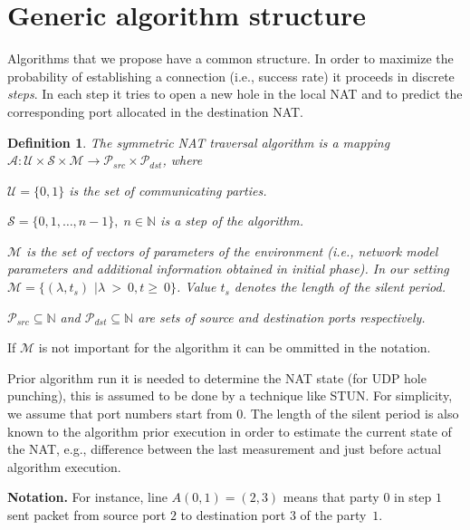 \documentclass{acm_proc_article-sp}
\newtheorem{mydef}{Definition}
\begin{document}
\section{Generic algorithm structure}
Algorithms that we propose have a common structure. In order to maximize the probability of establishing
a connection (i.e., success rate) it proceeds in discrete \emph{steps}. In each step it 
tries to open a new hole in the local NAT and to predict the corresponding port allocated in the destination
NAT.

\begin{mydef}
The symmetric NAT traversal algorithm is a mapping 
$\mathcal{A}: \mathcal{U} \times \mathcal{S} \times \mathcal{M} \rightarrow \mathcal{P}_{src} \times \mathcal{P}_{dst}$, 
where 
\begin{compactitem}
\item $\mathcal{U}=\{0,1\}$ is the set of communicating parties.
\item $\mathcal{S} = \{0, 1, \dots, n-1\}, \; n \in \mathbb{N}$ is a step of the algorithm.
\item $\mathcal{M}$ is the set of vectors of parameters of the environment (i.e., network model 
parameters and additional information obtained in initial phase). 
In our setting $\mathcal{M} = \{ (\lambda, t_s) $ $| \lambda~>~0, t\geq~0 \}$. Value $t_s$ denotes the length of the silent period. %
\item $\mathcal{P}_{src} \subseteq \mathbb{N}$ and $\mathcal{P}_{dst} \subseteq \mathbb{N}$
are sets of source and destination ports respectively.
\end{compactitem}
\end{mydef}
If $\mathcal{M}$ is not important for the algorithm it can be ommitted in the notation.

Prior algorithm run it is needed to 
determine the NAT state (for UDP hole punching), this is assumed to be done by a technique like STUN. For simplicity, we assume that port numbers
start from $0$. The length of the silent period is also known to the algorithm prior execution in order to estimate the current state of 
the NAT, e.g., difference between the last measurement and just before actual algorithm execution.

\par\smallskip
\noindent\textbf{Notation.} 
For instance, line $A(0,1) = (2,3)$ means that party $0$ in step $1$ sent packet from source port $2$ to destination port $3$
of the party~$1$.
\end{document}
